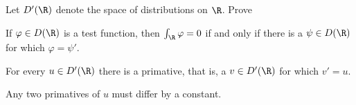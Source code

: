 Let $D'(\R)$ denote the space of distributions on $\R$. Prove
\begin{alist}
\item If $\varphi\in D(\R)$ is a test function, then
$\int_{\R}\varphi=0$ if and only if there is a $\psi\in D(\R)$ for
which $\varphi=\psi'$.
\item For every $u\in D'(\R)$ there is a primative, that is, a $v\in
D'(\R)$ for which $v'=u$.
\item Any two primatives of $u$ must differ by a constant.
\end{alist}
